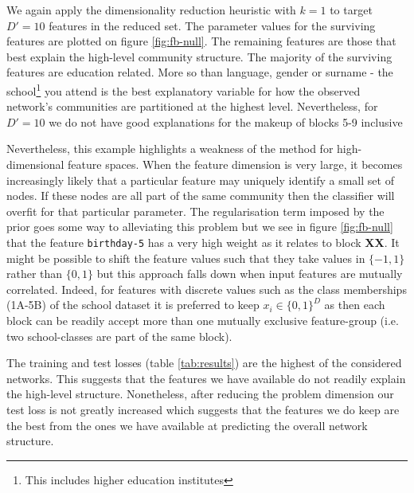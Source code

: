 We again apply the dimensionality reduction heuristic with $k=1$ to target $D'=10$ features in the reduced set. The parameter values for the surviving features are plotted on figure \ref{fig:fb-null}. The remaining features are those that best explain the high-level community structure. The majority of the surviving features are education related. More so than language, gender or surname - the school\footnote{This includes higher education institutes} you attend is the best explanatory variable for how the observed network's communities are partitioned at the highest level. Nevertheless, for $D'=10$ we do not have good explanations for the makeup of blocks 5-9 inclusive

Nevertheless, this example highlights a weakness of the method for high-dimensional feature spaces. When the feature dimension is very large, it becomes increasingly likely that a particular feature may uniquely identify a small set of nodes. If these nodes are all part of the same community then the classifier will overfit for that particular parameter. The regularisation term imposed by the prior goes some way to alleviating this problem but we see in figure \ref{fig:fb-null} that the feature \verb*|birthday-5| has a very high weight as it relates to block \textbf{XX}. It might be possible to shift the feature values such that they take values in $\{-1, 1\}$ rather than $\{0, 1\}$ but this approach falls down when input features are mutually correlated. Indeed, for features with discrete values such as the class memberships (1A-5B) of the school dataset it is preferred to keep $x_i \in \{0, 1\}^D$ as then each block can be readily accept more than one mutually exclusive feature-group (i.e. two school-classes are part of the same block).

The training and test losses (table \ref{tab:results}) are the highest of the considered networks. This suggests that the features we have available do not readily explain the high-level structure. Nonetheless, after reducing the problem dimension our test loss is not greatly increased which suggests that the features we do keep are the best from the ones we have available at predicting the overall network structure. 

